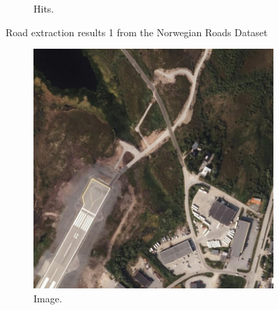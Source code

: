 \begin{figure}[H]
\begin{subfigure}{0.23\textwidth}
\caption{Hits.}
\vspace{0.2cm} %
\end{subfigure}
\caption{Road extraction results 1 from the Norwegian Roads Dataset} \label{fig:Norway_app_results}
\end{figure}

\begin{figure}[H]
\begin{subfigure}{0.23\textwidth}
\includegraphics[width=\textwidth]{figs/appendix/img1205.jpg}
\caption{ Image. }
\vspace{0.2cm} %
\end{subfigure}
\hspace*{\fill} %
\begin{subfigure}{0.23\textwidth}

\end{subfigure}
\end{figure}
